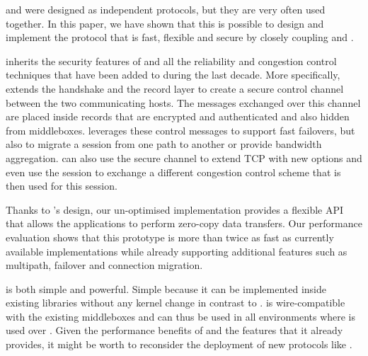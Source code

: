 

\tcp and \tls were designed as independent protocols, but they are very often used together. In this paper, we have shown that this is possible to design and implement the \tcpls protocol that is fast, flexible and secure by closely coupling \tcp and \tls.

\tcpls inherits the security features of  and all the reliability and congestion control techniques that have been added to \tcp during the last decade. More specifically, \tcpls extends the  handshake and the record layer to create a secure control channel between the two communicating hosts. The messages exchanged over this channel are placed inside \tls records that are encrypted and authenticated and also hidden from middleboxes. \tcpls leverages these control messages to support fast failovers, but also to migrate a \tcpls session from one path to another or provide bandwidth aggregation. \tcpls can also use the secure channel to extend TCP with new options and even use the \tcpls session to exchange a different congestion control scheme that is then used for this session.

Thanks to \tcpls's design, our un-optimised \tcpls implementation provides a
flexible API that allows the applications to perform zero-copy data transfers. Our performance evaluation shows that this prototype is more than twice as fast as currently available \quic implementations while already supporting additional features such as multipath, failover and connection migration.

\tcpls is both simple and powerful. Simple because it can be implemented inside existing \tls libraries without any kernel change in contrast to \tcp. \tcpls is wire-compatible with the existing \tcp middleboxes and can thus be used in all environments where \tls is used over \tcp. Given the performance benefits of \tcpls and the features that it already provides, it might be worth to reconsider the deployment of new protocols like \quic.  
